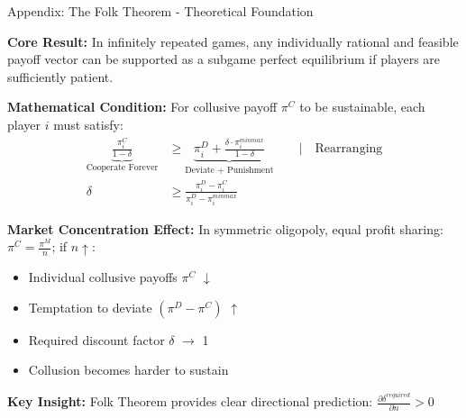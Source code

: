 \documentclass[10pt, aspectratio=169]{beamer}
\begin{document}
\begin{frame}{Appendix: The Folk Theorem - Theoretical Foundation}

    \textbf{Core Result:} In infinitely repeated games, any individually rational and feasible payoff vector can be supported as a subgame perfect equilibrium if players are sufficiently patient.
    
    \textbf{Mathematical Condition:}
    For collusive payoff $\pi^C$ to be sustainable, each player $i$ must satisfy:
    \begin{align*}
        \underbrace{\frac{\pi_i^C}{1-\delta}}_{\text{Cooperate Forever}} &\geq \underbrace{\pi_i^D + \frac{\delta \cdot \pi_i^{minmax}}{1-\delta}}_{\text{Deviate + Punishment}} \quad\quad \vert \quad\text{Rearranging} \\
        \delta &\geq \frac{\pi_i^D - \pi_i^C}{\pi_i^D - \pi_i^{minmax}}
    \end{align*}
    
    \textbf{Market Concentration Effect:}
    In symmetric oligopoly, equal profit sharing: $\pi^C = \frac{\pi^M}{n}$; if $n\uparrow$:
    \begin{multicols}{2}
        \begin{itemize}
            \item Individual collusive payoffs $\pi^C$ $\downarrow$
            \item Temptation to deviate $(\pi^D - \pi^C)$ $\uparrow$ 
            \item Required discount factor $\delta$ $\rightarrow$ 1
            \item Collusion becomes harder to sustain
        \end{itemize}
    \end{multicols}
    \textbf{Key Insight:}
    Folk Theorem provides clear directional prediction: $\frac{\partial \delta^{required}}{\partial n} > 0$

\end{frame}
\end{document}
